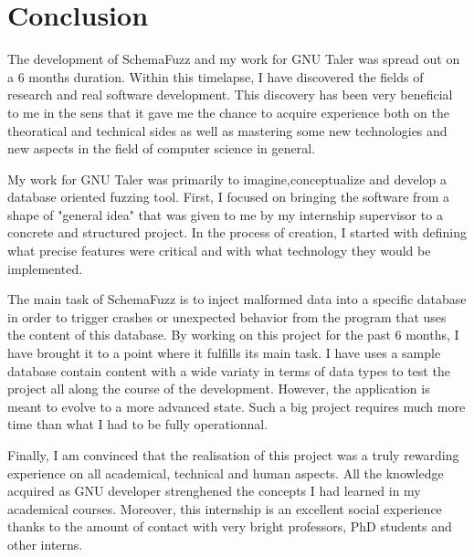 \documentclass{article}
\begin{document}
	\section{Conclusion}
   
The development of SchemaFuzz and my work for GNU Taler was spread out on a 6 months duration.
Within this timelapse, I have discovered the fields of research and real software development.
This discovery has been very beneficial to me in the sens that it gave me the chance to acquire experience both on the theoratical and technical sides as well as mastering some new technologies and new aspects in the field of computer science in general.

My work for GNU Taler was primarily to imagine,conceptualize and develop a database oriented fuzzing tool. 
First, I focused on bringing the software from a shape of "general idea" that was given to me by my internship supervisor to a concrete and structured project. In the process of creation, I started with defining what precise features were critical and with what technology they would be implemented.

The main task of SchemaFuzz is to inject malformed data into a specific database in order to trigger crashes or unexpected behavior from the program that uses the content of this database.
By working on this project for the past 6 months, I have brought it to a point where it fulfills its main task. I have uses a sample database contain content with a wide variaty in terms of data types to test the project all along the course of the development. However, the application is meant to evolve to a more advanced state. Such a big project requires much more time than what I had to be fully operationnal.

Finally, I am convinced that the realisation of this project was a truly rewarding experience on all academical, technical and human aspects. All the knowledge acquired as GNU developer strenghened the concepts I had learned in my academical courses. Moreover, this internship is an excellent social experience thanks to the amount of contact with very bright professors, PhD students and other interns.     
   
\end{document}
